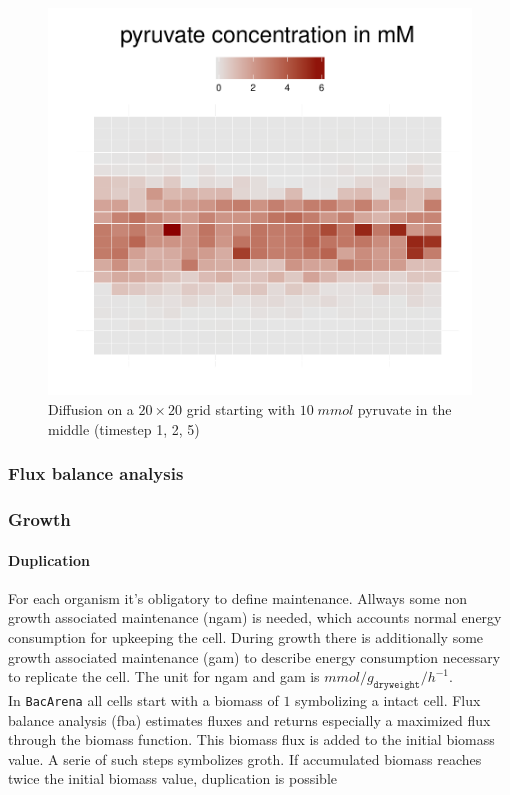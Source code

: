 \begin{figure}[h]
\begin{minipage}[t]{0.3\textwidth}
  \end{minipage}
  \begin{minipage}[t]{0.3\textwidth}
    \includegraphics[width=\textwidth]{diff5.pdf}
  \end{minipage}
  \caption{Diffusion on a $20\times20$ grid starting with $10\; mmol$ pyruvate in the middle (timestep 1, 2, 5)}
\end{figure}


\subsubsection{Flux balance analysis}

\subsubsection{Growth}
\paragraph{Duplication}
For each organism it's obligatory to define maintenance.
Allways some non growth associated maintenance (ngam) is needed, which accounts normal energy consumption for upkeeping the cell.
During growth there is additionally some growth associated maintenance (gam) to describe energy consumption necessary to replicate the cell. The unit for ngam and gam is $mmol/g_{\texttt{dryweight}}/h^{-1}$\cite{Thiele2010}.\\
In \texttt{BacArena} all cells start with a biomass of $1$ symbolizing a intact cell.
Flux balance analysis (fba) estimates fluxes and returns especially a maximized flux through the biomass function.
This biomass flux is added to the initial biomass value. A serie of such steps symbolizes groth.
If accumulated biomass reaches twice the initial biomass value, duplication is possible
